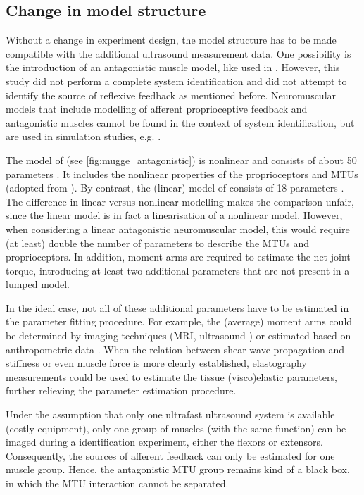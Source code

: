 \subsection{Change in model structure}
Without a change in experiment design, the model structure has to be made compatible with the additional ultrasound measurement data. One possibility is the introduction of an antagonistic muscle model, like used in \cite{de_gooijer-van_de_groep_estimation_2016}. However, this study did not perform a complete system identification and did not attempt to identify the source of reflexive feedback as mentioned before. Neuromuscular models that include modelling of afferent proprioceptive feedback and antagonistic muscles cannot be found in the context of system identification, but are used in simulation studies, e.g. \cite{munts_fixed_2011, mugge_modeling_2012}. 

The model of \citeauthor{mugge_modeling_2012} (see \autoref{fig:mugge_antagonistic}) is nonlinear and consists of about 50 parameters \cite{mugge_modeling_2012}. It includes the nonlinear properties of the proprioceptors and MTUs (adopted from \cite{winters_analysis_1985, stroeve_neuromuscular_1998}). By contrast, the (linear) model of \citeauthor{schouten_nmclab_2008} consists of 18 parameters \cite{schouten_nmclab_2008}. The difference in linear versus nonlinear modelling makes the comparison unfair, since the linear model is in fact a linearisation of a nonlinear model. However, when considering a linear antagonistic neuromuscular model, this would require (at least) double the number of parameters to describe the MTUs and proprioceptors. In addition, moment arms are required to estimate the net joint torque, introducing at least two additional parameters that are not present in a lumped model. 

In the ideal case, not all of these additional parameters have to be estimated in the parameter fitting procedure. For example, the (average) moment arms could be determined by imaging techniques (MRI, ultrasound \cite{fath_direct_2010}) or estimated based on anthropometric data \cite{ramsay_muscle_2009}. When the relation between shear wave propagation and stiffness or even muscle force is more clearly established, elastography measurements could be used to estimate the tissue (visco)elastic parameters, further relieving the parameter estimation procedure. 

Under the assumption that only one ultrafast ultrasound system is available (costly equipment), only one group of muscles (with the same function) can be imaged during a identification experiment, either the flexors or extensors. Consequently, the sources of afferent feedback can only be estimated for one muscle group. Hence, the antagonistic MTU group remains kind of a black box, in which the MTU interaction cannot be separated. 

